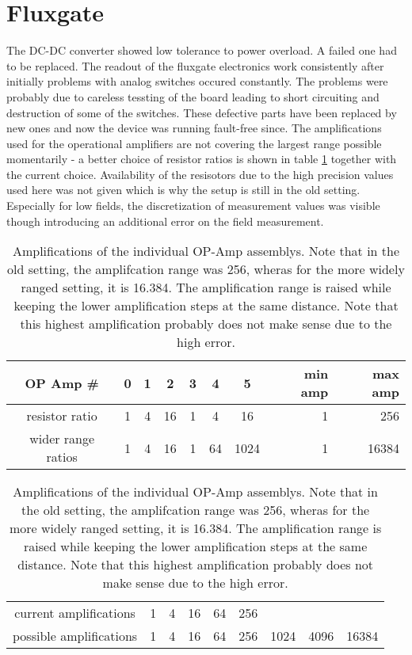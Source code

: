     \section{Fluxgate}
        The DC-DC converter showed low tolerance to power overload. A failed one had to be replaced.
        The readout of the fluxgate electronics work consistently after initially problems with analog switches occured constantly. The problems were probably due to careless tessting of the board leading to short circuiting and destruction of some of the switches. These defective parts have been replaced by new ones and now the device was running fault-free since.
        The amplifications used for the operational amplifiers are not covering the largest range possible momentarily - a better choice of resistor ratios is shown in table \ref{} together with the current choice. Availability of the resisotors due to the high precision values used here was not given which is why the setup is still in the old setting. Especially for low fields, the discretization of measurement values was visible though introducing an additional error on the field measurement.
        \begin{table}
            \centering
            \begin{tabular}{|c|ccc|ccc||rr|}
                \hline
                OP Amp \# & 0 & 1 & 2 & 3 & 4 & 5 & min amp& max amp\\
                \hline
                resistor ratio & 1 & 4 & 16 & 1 & 4 & 16 & 1 & 256\\
                wider range ratios & 1 & 4 & 16 & 1 & 64 & 1024& 1 & 16384\\
                \hline
            \end{tabular}
            \begin{tabular}{|c|cccccccc|}
                \hline
                current amplifications & 1 & 4 & 16 & 64 & 256 & & & \\
                possible amplifications & 1 & 4 & 16 & 64 & 256 & 1024 & 4096 & 16384\\
                \hline
            \end{tabular}
            \caption{Amplifications of the individual OP-Amp assemblys. Note that in the old setting, the amplifcation range was 256, wheras for the more widely ranged setting, it is 16.384. The amplification range is raised while keeping the lower amplification steps at the same distance. Note that this highest amplification probably does not make sense due to the high error.}
        \end{table}
